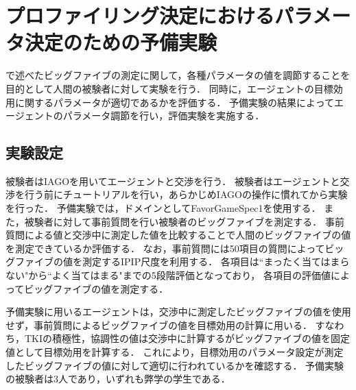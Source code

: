 

\chapter{プロファイリング決定におけるパラメータ決定のための予備実験}
で述べたビッグファイブの測定に関して，各種パラメータの値を調節することを目的として人間の被験者に対して実験を行う．
同時に，エージェントの目標効用に関するパラメータが適切であるかを評価する．
予備実験の結果によってエージェントのパラメータ調節を行い，評価実験を実施する．

\section{実験設定}
被験者はIAGOを用いてエージェントと交渉を行う．
被験者はエージェントと交渉を行う前にチュートリアルを行い，あらかじめIAGOの操作に慣れてから実験を行った．
予備実験では，ドメインとしてFavorGameSpec1を使用する．
また，被験者に対して事前質問を行い被験者のビッグファイブを測定する．
事前質問による値と交渉中に測定した値を比較することで人間のビッグファイブの値を測定できているか評価する．
なお，事前質問には50項目の質問によってビッグファイブの値を測定するIPIP尺度を利用する．
各項目は``まったく当てはまらない"から``よく当てはまる"までの5段階評価となっており，
各項目の評価値によってビッグファイブの値を測定する．

予備実験に用いるエージェントは，交渉中に測定したビッグファイブの値を使用せず，事前質問によるビッグファイブの値を目標効用の計算に用いる．
すなわち，TKIの積極性，協調性の値は交渉中に計算するがビッグファイブの値を固定値として目標効用を計算する．
これにより，目標効用のパラメータ設定が測定したビッグファイブの値に対して適切に行われているかを確認する．
予備実験の被験者は3人であり，いずれも弊学の学生である．

